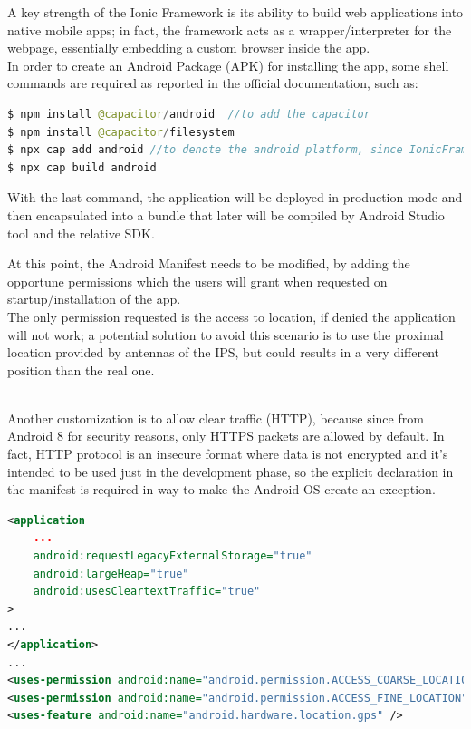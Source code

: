\documentclass[conference]{IEEEtran}
\begin{document}
A key strength of the Ionic Framework is its ability to build web applications into native mobile apps; in fact, the framework acts as a wrapper/interpreter for the webpage, essentially embedding a custom browser inside the app.
\\
In order to create an Android Package (APK) for installing the app, some shell commands are required as reported in the official documentation, such as:
\begin{lstlisting}[language=Java]
$ npm install @capacitor/android  //to add the capacitor
$ npm install @capacitor/filesystem
$ npx cap add android //to denote the android platform, since IonicFramework can also build for "iOS" operating system
$ npx cap build android
\end{lstlisting}
With the last command, the application will be deployed in production mode and then encapsulated into a bundle that later will be compiled by Android Studio \cite{b11} tool and the relative SDK.



At this point, the Android Manifest needs to be modified, by adding the opportune permissions which the users will grant when requested on startup/installation of the app.
\\
The only permission requested is the access to location, if denied the application will not work; a potential solution to avoid this scenario is to use the proximal location provided by antennas of the IPS, but could results in a very different position than the real one.

\\
Another customization is to allow clear traffic (HTTP), because since from Android 8 for security reasons, only HTTPS packets are allowed by default.
In fact, HTTP protocol is an insecure format where data is not encrypted and it's intended to be used just in the development phase, so the explicit declaration in the manifest is required in way to make the Android OS create an exception.

\begin{lstlisting}[language=XML, caption=Snippet of Android Manifest]
<application
    ...
    android:requestLegacyExternalStorage="true"
    android:largeHeap="true"
    android:usesCleartextTraffic="true"
>
...
</application>
...
<uses-permission android:name="android.permission.ACCESS_COARSE_LOCATION" />
<uses-permission android:name="android.permission.ACCESS_FINE_LOCATION" />
<uses-feature android:name="android.hardware.location.gps" />
        
\end{lstlisting}
\end{document}
